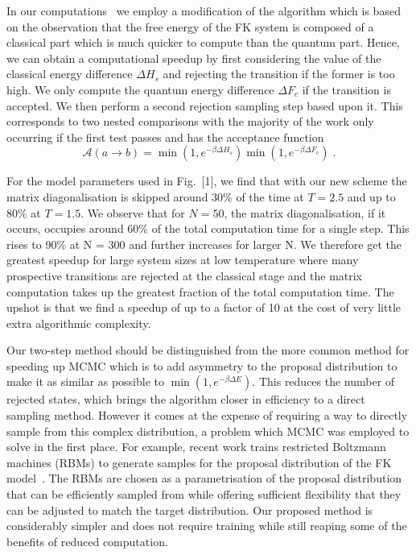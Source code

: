 In our computations~\autocite{hodsonMCMCFKModel2021} we employ a modification of the algorithm which is based on the observation that the free energy of the {FK} system is composed of a classical part which is much quicker to compute than the quantum part. Hence, we can obtain a computational speedup by first considering the value of the classical energy difference \(\Delta H_s\) and rejecting the transition if the former is too high. We only compute the quantum energy difference \(\Delta F_c\) if the transition is accepted. We then perform a second rejection sampling step based upon it. This corresponds to two nested comparisons with the majority of the work only occurring if the first test passes and has the acceptance function \[\mathcal{A}(a \to b) = \min\left(1, e^{-\beta \Delta H_s}\right)\min\left(1, e^{-\beta \Delta F_c}\right)\;.\]

For the model parameters used in Fig.~{[}1{]}, we find that with our new scheme the matrix diagonalisation is skipped around 30\% of the time at \(T = 2.5\) and up to 80\% at \(T = 1.5\). We observe that for \(N = 50\), the matrix diagonalisation, if it occurs, occupies around 60\% of the total computation time for a single step. This rises to 90\% at N = 300 and further increases for larger N. We therefore get the greatest speedup for large system sizes at low temperature where many prospective transitions are rejected at the classical stage and the matrix computation takes up the greatest fraction of the total computation time. The upshot is that we find a speedup of up to a factor of 10 at the cost of very little extra algorithmic complexity.

Our two-step method should be distinguished from the more common method for speeding up MCMC which is to add asymmetry to the proposal distribution to make it as similar as possible to \(\min\left(1, e^{-\beta \Delta E}\right)\). This reduces the number of rejected states, which brings the algorithm closer in efficiency to a direct sampling method. However it comes at the expense of requiring a way to directly sample from this complex distribution, a problem which MCMC was employed to solve in the first place. For example, recent work trains restricted Boltzmann machines (RBMs) to generate samples for the proposal distribution of the FK model~\autocite{huangAcceleratedMonteCarlo2017}. The RBMs are chosen as a parametrisation of the proposal distribution that can be efficiently sampled from while offering sufficient flexibility that they can be adjusted to match the target distribution. Our proposed method is considerably simpler and does not require training while still reaping some of the benefits of reduced computation.

